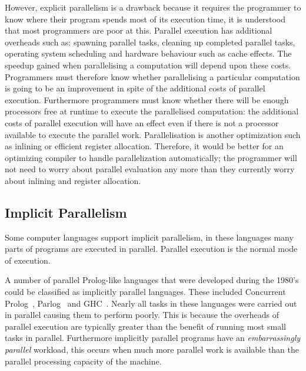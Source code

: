 However, explicit parallelism is a drawback because it requires the
programmer to know where their program spends most of its execution
time, it is understood that most programmers are poor at this.
Parallel execution has additional overheads such as:
spawning parallel tasks,
cleaning up completed parallel tasks,
operating system scheduling and
hardware behaviour such as cache effects.
The speedup gained when parallelising a computation will depend upon
these costs.
Programmers must therefore know whether parallelising a particular
computation is going to be an improvement in spite of the additional
costs of parallel execution.
Furthermore programmers must know whether there will be enough
processors free at runtime to execute the parallelised computation:
the additional costs of parallel execution will have an effect even
if there is not a processor available to execute the parallel work.
Parallelisation is another optimization such as inlining or efficient
register allocation.
Therefore,
it would be better for an optimizing compiler to handle parallelization
automatically;
the programmer will not need to worry about parallel evaluation any more
than they currently worry about inlining and register allocation.

\subsection{Implicit Parallelism}
\label{sec:lit_implicit-parallelism}

Some computer languages support implicit parallelism, in these
languages many parts of programs are executed in parallel.  Parallel
execution is the normal mode of execution.

A number of parallel Prolog-like languages that were developed during the
1980's could be classified as implicitly parallel languages.
These included Concurrent
Prolog~\cite{saraswat85:probl_with_concur_prolog,saraswat86:concurrent_prolog_definition,shapiro:flat_concur_prolog},
Parlog~\cite{parlog,clark84:parlog_sys_prog} and GHC~\cite{ueda:ghc}.
Nearly all tasks in these languages were carried out in
parallel causing them to perform poorly.
This is because the overheads of parallel execution are typically
greater than the benefit of running most small tasks in parallel.
Furthermore implicitly parallel programs have an \emph{embarrassingly
  parallel} workload,
this occurs when much more parallel work is available than the parallel
processing capacity of the machine.


